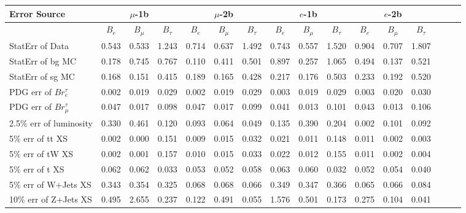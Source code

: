 \begin{sidewaystable}[p]
  \small
  \renewcommand{\arraystretch}{1.2}
  \centering

  \begin{tabular}{|l|ccc|ccc|ccc|ccc|ccc|}
  \hline
  Error Source & \multicolumn{3}{c|}{$\mu$-1b} & \multicolumn{3}{c|}{$\mu$-2b} & \multicolumn{3}{c|}{$e$-1b} & \multicolumn{3}{c|}{$e$-2b} \\
  \hline
                & $B_e$ & $B_\mu$ & $B_\tau$ & $B_e$ & $B_\mu$ & $B_\tau$ & $B_e$ & $B_\mu$ & $B_\tau$ & $B_e$ & $B_\mu$ & $B_\tau$ \\
  \hline
  StatErr of Data                            & 0.543 & 0.533 & 1.243 & 0.714 & 0.637 & 1.492 & 0.743 & 0.557 & 1.520 & 0.904 & 0.707 & 1.807 \\ 
  StatErr of bg MC                           & 0.178 & 0.745 & 0.767 & 0.110 & 0.411 & 0.501 & 0.897 & 0.257 & 1.065 & 0.494 & 0.137 & 0.521 \\ 
  StatErr of sg MC                           & 0.168 & 0.151 & 0.415 & 0.189 & 0.165 & 0.428 & 0.217 & 0.176 & 0.503 & 0.233 & 0.192 & 0.520 \\ 
  \hline
  PDG err of $Br^\tau_e$                     & 0.002 & 0.019 & 0.029 & 0.002 & 0.019 & 0.029 & 0.003 & 0.019 & 0.029 & 0.003 & 0.020 & 0.030 \\ 
  PDG err of $Br^\tau_\mu$                   & 0.047 & 0.017 & 0.098 & 0.047 & 0.017 & 0.099 & 0.041 & 0.013 & 0.101 & 0.043 & 0.013 & 0.106 \\ 
  2.5$\%$ err of luminosity                  & 0.330 & 0.461 & 0.120 & 0.093 & 0.064 & 0.049 & 0.135 & 0.390 & 0.204 & 0.002 & 0.101 & 0.092 \\ 
  5$\%$ err of tt XS                         & 0.002 & 0.000 & 0.151 & 0.009 & 0.015 & 0.032 & 0.021 & 0.011 & 0.148 & 0.011 & 0.002 & 0.003 \\ 
  5$\%$ err of tW XS                         & 0.002 & 0.001 & 0.157 & 0.010 & 0.015 & 0.033 & 0.022 & 0.012 & 0.155 & 0.011 & 0.002 & 0.004 \\ 
  5$\%$ err of t XS                          & 0.062 & 0.062 & 0.033 & 0.053 & 0.052 & 0.058 & 0.063 & 0.060 & 0.032 & 0.052 & 0.054 & 0.040 \\ 
  5$\%$ err of W+Jets XS                     & 0.343 & 0.354 & 0.325 & 0.068 & 0.068 & 0.066 & 0.349 & 0.347 & 0.366 & 0.065 & 0.066 & 0.084 \\ 
  10$\%$ err of Z+Jets XS                    & 0.495 & 2.655 & 0.237 & 0.122 & 0.491 & 0.055 & 1.576 & 0.501 & 0.173 & 0.275 & 0.104 & 0.041 \\ 

\end{tabular}
\end{sidewaystable}
